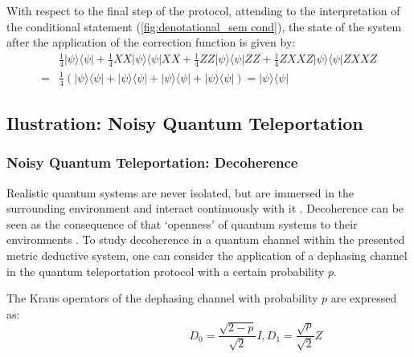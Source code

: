 With respect to the final step of the protocol, attending to the interpretation of the conditional statement (\autoref{fig:denotational_sem cond}), the state of the system after the application of the correction function is given by:
\begin{equation} \label{eq:teleport_correction}
  \begin{split}
  &\frac{1}{4}|\psi\rangle \langle \psi| + \frac{1}{4} X X|\psi\rangle \langle \psi|XX +\frac{1}{4} ZZ|\psi\rangle \langle \psi|ZZ + \frac{1}{4} ZXXZ|\psi\rangle \langle \psi|ZXXZ  \\
  =& \frac{1}{4} \left( |\psi\rangle \langle \psi| + |\psi\rangle \langle \psi| + |\psi\rangle \langle \psi|+ |\psi\rangle \langle \psi| \right) =  |\psi\rangle \langle \psi|
  \end{split}
\end{equation}

\subsection{Ilustration: Noisy Quantum Teleportation}


\subsubsection{Noisy Quantum Teleportation: Decoherence}


Realistic quantum systems are never isolated, but are immersed
in the surrounding environment and interact continuously with it \cite{schlosshauer2005decoherence}. Decoherence can be seen as the consequence of that  `openness' of quantum systems to their  environments .  To study decoherence in a quantum channel within the presented metric deductive system, one can consider the application of a dephasing channel in the quantum teleportation protocol with a certain probability $p$.

The Kraus operators of the dephasing channel with probability $p$ are expressed as:
\begin{equation}
    \hspace{100pt} D_{0}= \frac{\sqrt{2-p}}{\sqrt{2}} I,  D_{1}= \frac{\sqrt{p}}{\sqrt{2}} Z
\end{equation}


